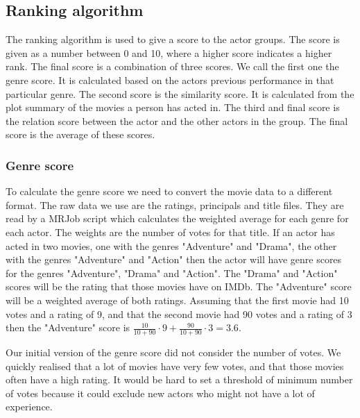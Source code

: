 \subsection{Ranking algorithm}

The ranking algorithm is used to give a score to the actor groups. The score is given as a number between 0 and 10, where a higher score indicates a higher rank. The final score is a combination of three scores. We call the first one the genre score. It is calculated based on the actors previous performance in that particular genre. The second score is the similarity score. It is calculated from the plot summary of the movies a person has acted in. The third and final score is the relation score between the actor and the other actors in the group. The final score is the average of these scores.


\subsubsection{Genre score}

To calculate the genre score we need to convert the movie data to a different format. The raw data we use are the ratings, principals and title files. They are read by a MRJob script which calculates the weighted average for each genre for each actor. The weights are the number of votes for that title. If an actor has acted in two movies, one with the genres "Adventure" and "Drama", the other with the genres "Adventure" and "Action" then the actor will have genre scores for the genres "Adventure", "Drama" and "Action". The "Drama" and "Action" scores will be the rating that those movies have on IMDb. The "Adventure" score will be a weighted average of both ratings. Assuming that the first movie had 10 votes and a rating of 9, and that the second movie had 90 votes and a rating of 3 then the "Adventure" score is $\frac{10}{10+90}\cdot9+\frac{90}{10+90}\cdot3=3.6$.

Our initial version of the genre score did not consider the number of votes. We quickly realised that a lot of movies have very few votes, and that those movies often have a high rating. It would be hard to set a threshold of minimum number of votes because it could exclude new actors who might not have a lot of experience.

